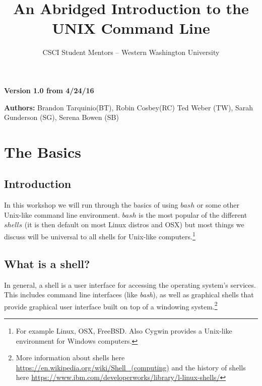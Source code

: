\documentclass[oneside]{book}
\begin{document}
\title{An Abridged Introduction to the UNIX Command Line}
\author{CSCI Student Mentors \--- Western Washington University}
\date{}

\maketitle
\tableofcontents
\newpage


\begin{versionhistory}
    \begin{center}
        \large{\textbf{Version 1.0 from 4/24/16}}
    \end{center}
    \large{\textbf{Authors:} Brandon Tarquinio(BT), Robin Cosbey(RC)  Ted Weber (TW), Sarah Gunderson (SG), Serena Bowen (SB)}
\end{versionhistory}
\chapter{The Basics}
\begin{center}
\end{center}

\section{Introduction}
In this workshop we will run through the basics of using $bash$ or some other Unix-like command line environment. $bash$ is the most popular of the different $shells$ (it is then default on most Linux distros and OSX) but most things we discuss will be universal to all shells for Unix-like computers.\footnote{For example Linux, OSX, FreeBSD. Also Cygwin provides a Unix-like environment for Windows computers.} 

\section{What is a shell?}
In general, a shell is a user interface for accessing the operating system's services. This includes command line interfaces (like \textit{bash}), as well as graphical shells that provide graphical user interface built on top of a windowing system.\footnote{More information about shells here \url{https://en.wikipedia.org/wiki/Shell_(computing)} and the history of shells here \url{https://www.ibm.com/developerworks/library/l-linux-shells/}} 
\end{document}
